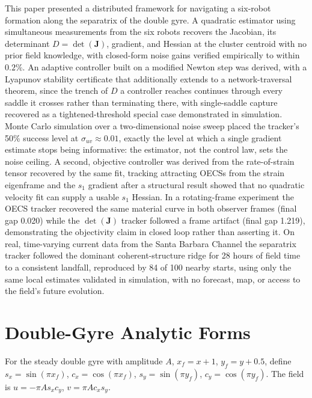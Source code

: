 \documentclass[lettersize,journal]{IEEEtran}
\begin{document}
This paper presented a distributed framework for navigating a six-robot
formation along the separatrix of the double gyre. A quadratic
estimator using simultaneous measurements from the six robots recovers the
Jacobian, its determinant $D = \det(\mathbf{J})$, gradient, and Hessian at
the cluster centroid with no prior field knowledge, with closed-form noise
gains verified empirically to within $0.2\%$. An adaptive controller built
on a modified Newton step was derived, with a Lyapunov stability
certificate that additionally extends to a network-traversal theorem,
since the trench of $D$ a controller reaches continues through every
saddle it crosses rather than terminating there, with single-saddle
capture recovered as a tightened-threshold special case demonstrated in
simulation. Monte Carlo simulation over a two-dimensional noise sweep
placed the tracker's 50\% success level at $\sigma_{uv} \approx 0.01$,
exactly the level at which a single gradient estimate stops being
informative: the estimator, not the control law, sets the noise ceiling.
A second, objective controller was derived from the rate-of-strain
tensor recovered by the same fit, tracking attracting OECSs from the
strain eigenframe and the $s_1$ gradient after a structural result
showed that no quadratic velocity fit can supply a usable $s_1$
Hessian. In a rotating-frame experiment the OECS tracker recovered the
same material curve in both observer frames (final gap 0.020) while the
$\det(\mathbf{J})$ tracker followed a frame artifact (final gap 1.219),
demonstrating the objectivity claim in closed loop rather than
asserting it.
On real, time-varying current data from the Santa Barbara Channel the
separatrix tracker followed the dominant coherent-structure ridge for
28 hours of field time to a consistent landfall, reproduced by 84 of
100 nearby starts, using only the same local estimates validated in
simulation, with no forecast, map, or access to the field's future
evolution.


\appendices

\section{Double-Gyre Analytic Forms}
\label{app:analytic}

For the steady double gyre with amplitude $A$, $x_f = x + 1$,
$y_f = y + 0.5$, define $s_x = \sin(\pi x_f)$, $c_x = \cos(\pi x_f)$,
$s_y = \sin(\pi y_f)$, $c_y = \cos(\pi y_f)$. The field is
$u = -\pi A s_x c_y$, $v = \pi A c_x s_y$.
\end{document}
